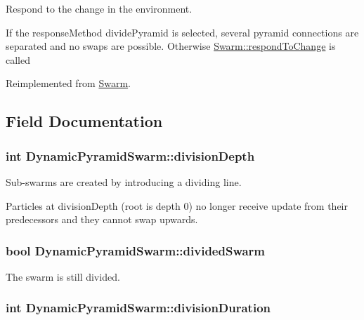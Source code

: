 Respond to the change in the environment. 

If the responseMethod dividePyramid is selected, several pyramid connections are separated and no swaps are possible. Otherwise \hyperlink{classSwarm_f98488b9ca17c07c89a591040f360db6}{Swarm::respondToChange} is called 

Reimplemented from \hyperlink{classSwarm_f98488b9ca17c07c89a591040f360db6}{Swarm}.

\subsection{Field Documentation}
\hypertarget{classDynamicPyramidSwarm_1693ca6aad7a16e24a0554c1dfa4e285}{
\subsubsection{\setlength{\rightskip}{0pt plus 5cm}int {\bf DynamicPyramidSwarm::divisionDepth}}}
\label{classDynamicPyramidSwarm_1693ca6aad7a16e24a0554c1dfa4e285}


Sub-swarms are created by introducing a dividing line. 

Particles at divisionDepth (root is depth 0) no longer receive update from their predecessors and they cannot swap upwards. \hypertarget{classDynamicPyramidSwarm_cddb5d45ca6e266ac8b248aee744b9d9}{
\subsubsection{\setlength{\rightskip}{0pt plus 5cm}bool {\bf DynamicPyramidSwarm::dividedSwarm}}}
\label{classDynamicPyramidSwarm_cddb5d45ca6e266ac8b248aee744b9d9}


The swarm is still divided. 

\hypertarget{classDynamicPyramidSwarm_3d2fa3e702d824e412c07673b54a87fa}{
\subsubsection{\setlength{\rightskip}{0pt plus 5cm}int {\bf DynamicPyramidSwarm::divisionDuration}}}
\label{classDynamicPyramidSwarm_3d2fa3e702d824e412c07673b54a87fa}


